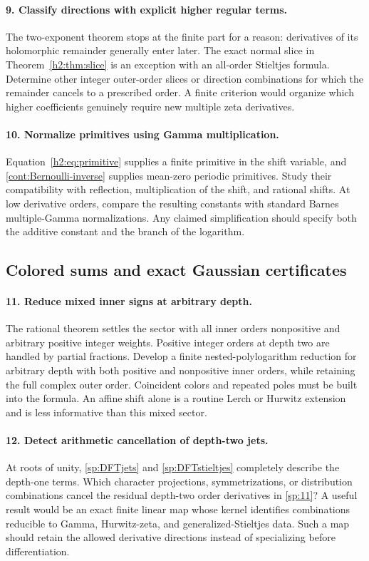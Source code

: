 \documentclass[11pt,a4paper]{article}
\theoremstyle{definition}
\theoremstyle{remark}
\numberwithin{equation}{section}
\begin{document}
\paragraph{9. Classify directions with explicit higher regular terms.}
The two-exponent theorem stops at the finite part for a reason:
derivatives of its holomorphic remainder generally enter later.
The exact normal slice in Theorem~\ref{h2:thm:slice} is an exception
with an all-order Stieltjes formula. Determine other integer
outer-order slices or direction combinations for which the
remainder cancels to a prescribed order. A finite criterion would
organize which higher coefficients genuinely require new multiple
zeta derivatives.

\paragraph{10. Normalize primitives using Gamma multiplication.}
Equation~\eqref{h2:eq:primitive} supplies a finite primitive in the
shift variable, and \eqref{cont:Bernoulli-inverse} supplies
mean-zero periodic primitives. Study their compatibility with
reflection, multiplication of the shift, and rational shifts.
At low derivative orders, compare the resulting constants with
standard Barnes multiple-Gamma normalizations. Any claimed
simplification should specify both the additive constant and the
branch of the logarithm.

\subsection{Colored sums and exact Gaussian certificates}

\paragraph{11. Reduce mixed inner signs at arbitrary depth.}
The rational theorem settles the sector with all inner orders
nonpositive and arbitrary positive integer weights. Positive
integer orders at depth two are handled by partial fractions.
Develop a finite nested-polylogarithm reduction for arbitrary depth
with both positive and nonpositive inner orders, while retaining
the full complex outer order. Coincident colors and repeated poles
must be built into the formula. An affine shift alone is a routine
Lerch or Hurwitz extension and is less informative than this mixed
sector.

\paragraph{12. Detect arithmetic cancellation of depth-two jets.}
At roots of unity, \eqref{sp:DFTjets} and
\eqref{sp:DFTstieltjes} completely describe the depth-one terms.
Which character projections, symmetrizations, or distribution
combinations cancel the residual depth-two order derivatives in
\eqref{sp:11}? A useful result would be an exact finite linear map
whose kernel identifies combinations reducible to Gamma,
Hurwitz-zeta, and generalized-Stieltjes data. Such a map should
retain the allowed derivative directions instead of specializing
before differentiation.
\end{document}

